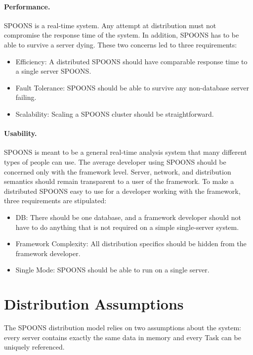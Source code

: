 \documentclass[12pt]{ucthesis}
\begin{document}
\paragraph{Performance.}
SPOONS is a real-time system.
Any attempt at distribution must not compromise the response time of the system.
In addition, SPOONS has to be able to survive a server dying. These two concerns led to three requirements:

\begin{itemize}
   \item Efficiency: A distributed SPOONS should have comparable response time to a single server SPOONS.
   \item Fault Tolerance: SPOONS should be able to survive any non-database server failing.
   \item Scalability: Scaling a SPOONS cluster should be straightforward.
\end{itemize}

\paragraph{Usability.}
SPOONS is meant to be a general real-time analysis system that many different types of people can use.
The average developer using SPOONS should be concerned only with the framework level.
Server, network, and distribution semantics should remain transparent to a user of the framework.
To make a distributed SPOONS easy to use for a developer working with the framework, three requirements
are stipulated:

\begin{itemize}
   \item DB: There should be one database, and a framework developer should not have to do anything that is not required on a simple single-server system.
   \item Framework Complexity: All distribution specifics should be hidden from the framework developer.
   \item Single Mode: SPOONS should be able to run on a single server.
\end{itemize}

\section{Distribution Assumptions}
\label{arch-dist-assumptions}
The SPOONS distribution model relies on two assumptions about the system: every server contains
exactly the same data in memory and every Task can be uniquely referenced.
\end{document}
